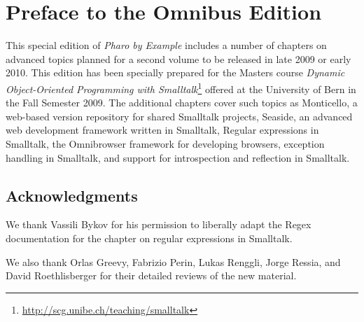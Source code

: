 \documentclass[a4paper,10pt,twoside]{book}
\begin{document}
	\sloppy
	\frontmatter
\fi
\chapter{Preface to the Omnibus Edition}


This special edition of \emph{Pharo by Example} includes a number of chapters on advanced topics planned for a second volume to be released in late 2009 or early 2010.
This edition has been specially prepared for the Masters course \emph{Dynamic Object-Oriented Programming with Smalltalk}\footnote{\url{http://scg.unibe.ch/teaching/smalltalk}} offered at the University of Bern in the Fall Semester 2009.
The additional chapters cover such topics as
Monticello, a web-based version repository for shared Smalltalk projects,
Seaside, an advanced web development framework written in Smalltalk,
Regular expressions in Smalltalk,
the Omnibrowser framework for developing browsers,
exception handling in Smalltalk, and
support for introspection and reflection in Smalltalk.

\section*{Acknowledgments}

We thank Vassili Bykov for his permission to liberally adapt the Regex documentation for the chapter on regular expressions in Smalltalk.

We also thank
Orlas Greevy,
Fabrizio Perin,
Lukas Renggli,
Jorge Ressia,
and
David Roethlisberger
for their detailed reviews of the new material.




\ifx\wholebook\relax\else
   
   
\end{document}
